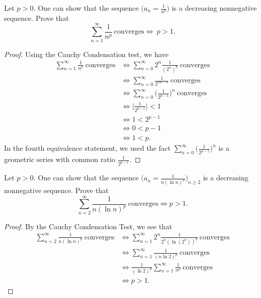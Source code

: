 \documentclass[a4paper]{article}
\begin{document}
\begin{eg}
    Let \( p > 0  \). One can show that the sequence \( \Big({a}_{n} = \frac{ 1 }{ n^{p} }  \Big) \) is a decreasing nonnegative sequence. Prove that 
    \[  \sum_{ n=1  }^{ \infty  } \frac{ 1 }{ n^{p} }  \ \text{converges} \iff \ p >  1. \]
\end{eg}
\begin{proof}
Using the Cauchy Condensation test, we have
\begin{align*}
\sum_{ n=1  }^{ \infty  } \frac{ 1 }{ n^{p} }  \ \text{converges} &\iff \sum_{ n=0 }^{ \infty  } 2^{n} \frac{ 1 }{ (2^{n})^{p} } \ \text{converges} \\ 
                                                                  &\iff \sum_{ n=0  }^{ \infty  } \frac{ 1 }{ 2^{np-n} }  \ \text{converges} \\
                                                                  &\iff \sum_{ n=0 }^{ \infty  } \Big(  \frac{ 1  }{ 2^{p-1} }  \Big)^{n}  \ \text{converges} \\
                                                                  &\iff \Big|  \frac{ 1  }{ 2^{p-1} }  \Big| < 1 \\
                                                                  &\iff 1 < 2^{p-1} \\
                                                                  &\iff 0 < p - 1 \\
                                                                  &\iff 1 < p. 
\end{align*}
In the fourth equivalence statement, we used the fact \( \sum_{ n=0 }^{ \infty  } \Big(  \frac{ 1 }{ 2^{p-1} }  \Big)^{n} \) is a geometric series with common ratio \( \frac{ 1 }{ 2^{p-1} }  \). 
\end{proof}

\begin{eg}
    Let \( p > 0  \). One can show that the sequence \( \Big(  {a}_{n} = \frac{ 1  }{ n (\ln n )^{p} }  \Big)_{n \geq 2} \) is a decreasing nonnegative sequence. Prove that 
    \[ \sum_{ n=2 }^{ \infty  } \frac{ 1 }{ n (\ln n )^{p} }  \ \text{converges} \iff p > 1.  \]
\end{eg}
\begin{proof}
By the Cauchy Condensation Test, we see that 
\begin{align*}
    \sum_{ n=2 }^{ \infty  } \frac{ 1 }{ n (\ln n )^{p} } \ \text{converges} &\iff \sum_{ n=1  }^{ \infty  } 2^{n} \frac{ 1 }{ 2^{n} (\ln (2^{n}))^{p} } \ \text{converges} \\
                                                                             &\iff \sum_{ n=1 }^{ \infty  } \frac{ 1 }{ (n \ln 2)^{p} }  \ \text{converges} \\
                                                                             &\iff \frac{ 1 }{ (\ln 2)^{p} } \sum_{ n=1  }^{ \infty  } \frac{ 1 }{ n^{p} }  \ \text{converges} \\
                                                                             &\iff p > 1. 
\end{align*}
\end{proof}
\end{document}
